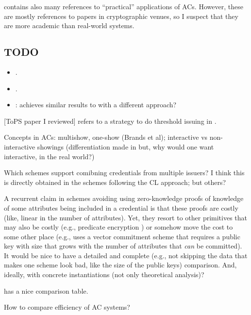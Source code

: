 \cite{hs21} contains also many references to ``practical'' applications of
ACs. However, these are mostly references to papers in cryptographic venues,
so I suspect that they are more academic than real-world systems.

\subsection{TODO}

\begin{itemize}
\item \cite{bckl08}.
\item \cite{sand20}.
\item \cite{kkl+16}: achieves similar results to \cite{cgm16} with a different approach?
\end{itemize}

[ToPS paper I reviewed] refers to a strategy to do threshold issuing in \cite{bbh06}.

Concepts in ACs: multishow, one-show (Brands et al); interactive vs non-interactive
showings (differentiation made in \cite[p.6]{fhs19} but, why would one want interactive,
in the real world?)

Which schemes support comibning credentials from multiple issuers? I think this
is directly obtained in the schemes following the CL approach; but others?

A recurrent claim in schemes avoiding using zero-knowledge proofs of knowledge
of some attributes being included in a credential is that these proofs are costly
(like, linear in the number of attributes). Yet, they resort to other primitives
that may also be costly (e.g., predicate encryption \cite{dmm+18}) or somehow move
the cost to some other place (e.g., \cite{fhs19} uses a vector commitment scheme
that requires a public key with size that grows with the number of attributes
that \emph{can} be committed). It would be nice to have a detailed and complete
(e.g., not skipping the data that makes one scheme look bad, like the size of
the public keys) comparison. And, ideally, with concrete instantiations (not only
theoretical analysis)?

\cite{fhs19} has a nice comparison table.

How to compare efficiency of AC systems?


